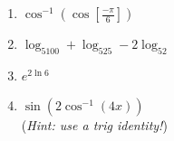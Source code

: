 \documentclass[12pt,fleqn]{article}
\begin{document}
\begin{enumerate}
\begin{enumerate}
	  \item $\displaystyle \cos^{-1}\left(\cos\left[\frac{-\pi }6\right]\right)$
	  
	  \vfill
	  
	  \item $\displaystyle \log_5100+\log_525-2\log_52$
	  
	  \vfill
	  
	  \item $\displaystyle e^{2\ln 6}$
	  
	  \vfill
	  
	  \item $\displaystyle \sin\left(2\cos^{-1}(4x)\right)$\\
	  (\emph{Hint: use a trig identity!})
	  
	  \vfill
	  
	\end{enumerate}
\end{enumerate}
\end{document}
